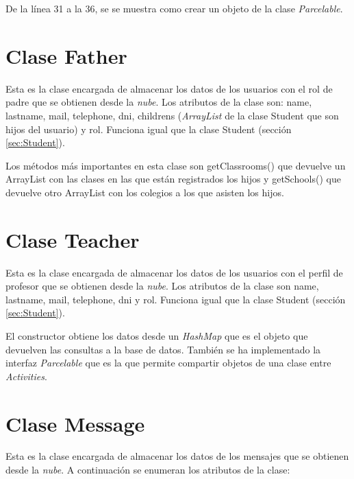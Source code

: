 		De la línea 31 a la 36, se se muestra como crear un objeto de la clase {\it Parcelable}.
	
	\section{Clase {\ttfamily Father}}
	
		Esta es la clase encargada de almacenar los datos de los usuarios con el rol de padre que se obtienen desde la {\it nube}.
		Los atributos de la clase son: name, lastname, mail, telephone, dni, childrens ({\it ArrayList} \cite{12:arraytist:online} de la clase {\ttfamily Student} que son hijos del usuario) y rol.
		Funciona igual que la clase {\ttfamily Student} (sección \ref{sec:Student}).
				
		\bigskip
		Los métodos más importantes en esta clase son {\ttfamily getClassrooms()} que devuelve un ArrayList con las clases en las que están registrados los hijos y {\ttfamily getSchools()} que devuelve otro ArrayList con los colegios a los que asisten los hijos.
	
	\section{Clase {\ttfamily Teacher}}
	
		Esta es la clase encargada de almacenar los datos de los usuarios con el perfil de profesor que se obtienen desde la {\it nube}.
		Los atributos de la clase son name, lastname, mail, telephone, dni y rol.
		Funciona igual que la clase {\ttfamily Student} (sección \ref{sec:Student}).
		
		El constructor obtiene los datos desde un {\it HashMap} \cite{10:hashmap:online} que es el objeto que devuelven las consultas a la base de datos. También se ha implementado la interfaz {\it Parcelable} \cite{11:parcelable:online} que es la que permite compartir objetos de una clase entre {\it Activities}. 
		
	\section{Clase {\ttfamily Message}}
	
		Esta es la clase encargada de almacenar los datos de los mensajes que se obtienen desde la {\it nube}.
		A continuación se enumeran los atributos de la clase:
		
